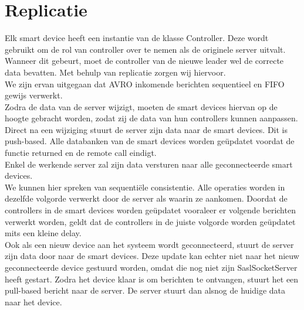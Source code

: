 \documentclass[a4paper]{article}
\begin{document}
	\section{Replicatie}
		Elk smart device heeft een instantie van de klasse Controller. Deze wordt gebruikt om de rol van controller over te nemen als de originele server uitvalt. Wanneer dit gebeurt, moet de controller van de nieuwe leader wel de correcte data bevatten. Met behulp van replicatie zorgen wij hiervoor. \\
		We zijn ervan uitgegaan dat AVRO inkomende berichten sequentieel en FIFO gewijs verwerkt. \\
		Zodra de data van de server wijzigt, moeten de smart devices hiervan op de hoogte gebracht worden, zodat zij de data van hun controllers kunnen aanpassen. Direct na een wijziging stuurt de server zijn data naar de smart devices. Dit is push-based. Alle databanken van de smart devices worden ge\"updatet voordat de functie returned en de remote call eindigt. \\
		Enkel de werkende server zal zijn data versturen naar alle geconnecteerde smart devices. \\
		We kunnen hier spreken van sequenti\"ele consistentie. Alle operaties worden in dezelfde volgorde verwerkt door de server als waarin ze aankomen. Doordat de controllers in de smart devices worden ge\"updatet vooraleer er volgende berichten verwerkt worden, geldt dat de controllers in de juiste volgorde worden ge\"updatet mits een kleine delay.	\\
		Ook als een nieuw device aan het systeem wordt geconnecteerd, stuurt de server zijn data door naar de smart devices. Deze update kan echter niet naar het nieuw geconnecteerde device gestuurd worden, omdat die nog niet zijn SaslSocketServer heeft gestart. Zodra het device klaar is om berichten te ontvangen, stuurt het een pull-based bericht naar de server. De server stuurt dan alsnog de huidige data naar het device. \\
	
\end{document}
